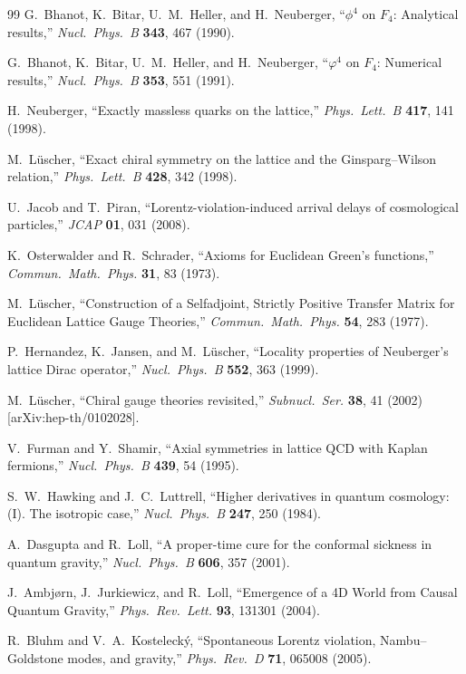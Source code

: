 \documentclass[11pt,a4paper]{article}
\begin{document}
\begin{thebibliography}{99}
G.~Bhanot, K.~Bitar, U.~M.~Heller, and H.~Neuberger, ``$\phi^4$ on $F_4$: Analytical results,'' \emph{Nucl.\ Phys.\ B} \textbf{343}, 467 (1990).

G.~Bhanot, K.~Bitar, U.~M.~Heller, and H.~Neuberger, ``$\varphi^4$ on $F_4$: Numerical results,'' \emph{Nucl.\ Phys.\ B} \textbf{353}, 551 (1991).

H.~Neuberger, ``Exactly massless quarks on the lattice,'' \emph{Phys.\ Lett.\ B} \textbf{417}, 141 (1998).

M.~L\"uscher, ``Exact chiral symmetry on the lattice and the Ginsparg--Wilson relation,'' \emph{Phys.\ Lett.\ B} \textbf{428}, 342 (1998).

U.~Jacob and T.~Piran, ``Lorentz-violation-induced arrival delays of cosmological particles,'' \emph{JCAP} \textbf{01}, 031 (2008).

K.~Osterwalder and R.~Schrader, ``Axioms for Euclidean Green's functions,'' \emph{Commun.\ Math.\ Phys.} \textbf{31}, 83 (1973).

M.~L\"uscher, ``Construction of a Selfadjoint, Strictly Positive Transfer Matrix for Euclidean Lattice Gauge Theories,'' \emph{Commun.\ Math.\ Phys.} \textbf{54}, 283 (1977).

P.~Hernandez, K.~Jansen, and M.~L\"uscher, ``Locality properties of Neuberger's lattice Dirac operator,'' \emph{Nucl.\ Phys.\ B} \textbf{552}, 363 (1999).

M.~L\"uscher, ``Chiral gauge theories revisited,'' \emph{Subnucl.\ Ser.} \textbf{38}, 41 (2002) [arXiv:hep-th/0102028].

V.~Furman and Y.~Shamir, ``Axial symmetries in lattice QCD with Kaplan fermions,'' \emph{Nucl.\ Phys.\ B} \textbf{439}, 54 (1995).

S.~W.~Hawking and J.~C.~Luttrell, ``Higher derivatives in quantum cosmology: (I). The isotropic case,'' \emph{Nucl.\ Phys.\ B} \textbf{247}, 250 (1984).

A.~Dasgupta and R.~Loll, ``A proper-time cure for the conformal sickness in quantum gravity,'' \emph{Nucl.\ Phys.\ B} \textbf{606}, 357 (2001).

J.~Ambj\o rn, J.~Jurkiewicz, and R.~Loll, ``Emergence of a 4D World from Causal Quantum Gravity,'' \emph{Phys.\ Rev.\ Lett.} \textbf{93}, 131301 (2004).

R.~Bluhm and V.~A.~Kosteleck\'y, ``Spontaneous Lorentz violation, Nambu--Goldstone modes, and gravity,'' \emph{Phys.\ Rev.\ D} \textbf{71}, 065008 (2005).

\end{thebibliography}
\end{document}
